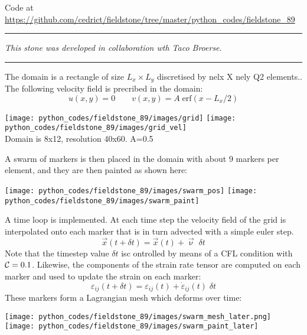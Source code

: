 

\begin{center}
Code at \url{https://github.com/cedrict/fieldstone/tree/master/python_codes/fieldstone_89}
\end{center}

\par\noindent\rule{\textwidth}{0.4pt}

{\sl This stone was developed in collaboration wth Taco Broerse}. 

\par\noindent\rule{\textwidth}{0.4pt}


The domain is a rectangle of size $L_x\times L_y$ discretised by nelx X nely Q2 elements..
The following velocity field is precribed in the domain:
\[
u(x,y)=0
\qquad
v(x,y)=A\;  \text{erf} (x-L_x/2)
\]
\begin{center}
\texttt{[image: python\_codes/fieldstone\_89/images/grid]}
\texttt{[image: python\_codes/fieldstone\_89/images/grid\_vel]}\\
{\captionfont Domain is 8x12, resolution 40x60. A=0.5}
\end{center}

A swarm of markers is then placed in the domain with about 9 markers per element, 
and they are then painted as shown here:
\begin{center}
\texttt{[image: python\_codes/fieldstone\_89/images/swarm\_pos]}
\texttt{[image: python\_codes/fieldstone\_89/images/swarm\_paint]}
\end{center}

A time loop is implemented. At each time step the velocity field of the grid is 
interpolated onto each marker that is in turn advected with a simple euler step. 
\[
\vec{x}(t+\delta t) = \vec{x}(t) + \vec\upnu \; \delta t
\]
Note that the timestep value $\delta t$ isc ontrolled by means of a CFL condition 
with ${\cal C}=0.1$. Likewise, the components of the strain rate tensor are computed on each marker and 
used to update the strain on each marker:
\[
\varepsilon_{ij}(t+\delta t) = \varepsilon_{ij}(t) + \dot\varepsilon_{ij}(t) \; \delta t
\]
These markers form a Lagrangian mesh which deforms over time:
\begin{center}
\texttt{[image: python\_codes/fieldstone\_89/images/swarm\_mesh\_later.png]}
\texttt{[image: python\_codes/fieldstone\_89/images/swarm\_paint\_later]}
\end{center}




